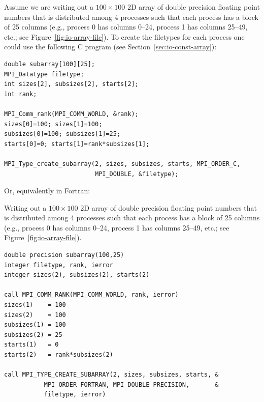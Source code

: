 \begin{example}
\label{io-subarray}
Assume we are writing out a $100\times100$ 2D array of double
precision floating point numbers that is
distributed among 4 processes such that each process has a block of
25 columns (e.g., process 0 has columns 0--24, process 1 has columns
25--49, etc.; see Figure~\ref{fig:io-array-file}).
To create the filetypes for each process one could
use the following C program
(see Section~\ref{sec:io-const-array}):

\begin{lstlisting}[language={[MPI]C}]
double subarray[100][25];
MPI_Datatype filetype;
int sizes[2], subsizes[2], starts[2];
int rank;

MPI_Comm_rank(MPI_COMM_WORLD, &rank);
sizes[0]=100; sizes[1]=100;
subsizes[0]=100; subsizes[1]=25;
starts[0]=0; starts[1]=rank*subsizes[1];

MPI_Type_create_subarray(2, sizes, subsizes, starts, MPI_ORDER_C,
                         MPI_DOUBLE, &filetype);
\end{lstlisting}
\end{example}

Or, equivalently in Fortran:

\begin{example}
\label{io-subarrayfortran}
Writing out a $100\times100$ 2D array of double
precision floating point numbers that is
distributed among 4 processes such that each process has a block of
25 columns (e.g., process 0 has columns 0--24, process 1 has columns
25--49, etc.; see Figure~\ref{fig:io-array-file}).
\begin{lstlisting}[language={[MPI]Fortran}]
double precision subarray(100,25)
integer filetype, rank, ierror
integer sizes(2), subsizes(2), starts(2)

call MPI_COMM_RANK(MPI_COMM_WORLD, rank, ierror)
sizes(1)    = 100
sizes(2)    = 100
subsizes(1) = 100
subsizes(2) = 25
starts(1)   = 0
starts(2)   = rank*subsizes(2)

call MPI_TYPE_CREATE_SUBARRAY(2, sizes, subsizes, starts, &
           MPI_ORDER_FORTRAN, MPI_DOUBLE_PRECISION,       &
           filetype, ierror)
\end{lstlisting}
\end{example}

